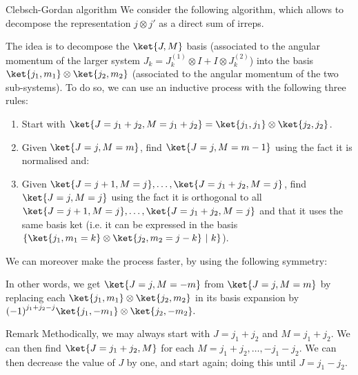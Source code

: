 \documentclass[a4paper]{article}
\begin{document}
\begin{parag}{Clebsch-Gordan algorithm}
    We consider the following algorithm, which allows to decompose the representation $j \otimes j'$ as a direct sum of irreps.

    The idea is to decompose the $\ket{J, M}$ basis (associated to the angular momentum of the larger system $J_k = J_k^{\left(1\right)} \otimes I + I \otimes J_k^{\left(2\right)}$) into the basis $\ket{j_1, m_1} \otimes \ket{j_2, m_2}$ (associated to the angular momentum of the two sub-systems). To do so, we can use an inductive process with the following three rules:
    \begin{enumerate}
        \item Start with $\ket{J = j_1 + j_2, M = j_1 + j_2} = \ket{j_1, j_1} \otimes \ket{j_2, j_2}$.
        \item Given $\ket{J = j, M = m}$, find $\ket{J = j, M = m - 1}$ using the fact it is normalised and:
        \item Given $\ket{J = j+1, M = j}, \ldots, \ket{J = j_1 + j_2, M = j}$, find $\ket{J = j, M = j}$ using the fact it is orthogonal to all $\ket{J = j+1, M = j}, \ldots, \ket{J = j_1 + j_2, M = j}$ and that it uses the same basis ket (i.e. it can be expressed in the basis $\left\{\ket{j_1, m_1 = k} \otimes \ket{j_2, m_2 = j - k} \suchthat k \right\}$).
    \end{enumerate}

    We can moreover make the process faster, by using the following symmetry: 

    In other words, we get $\ket{J=j, M=-m}$ from $\ket{J=j, M=m}$ by replacing each $\ket{j_1, m_1} \otimes \ket{j_2, m_2}$ in its basis expansion by $\left(-1\right)^{j_1 + j_2 - j} \ket{j_1, -m_1} \otimes \ket{j_2, -m_2}.$

    \begin{subparag}{Remark}
        Methodically, we may always start with $J = j_1 + j_2$ and $M = j_1 + j_2$. We can then find $\ket{J = j_1 + j_2, M}$ for each $M = j_1 + j_2, \ldots, -j_1 - j_2$. We can then decrease the value of $J$ by one, and start again; doing this until $J = j_1 - j_2$.
    \end{subparag}


\end{parag}
\end{document}

